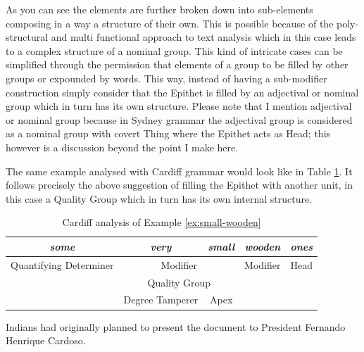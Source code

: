 As you can see the elements are further broken down into sub-elements composing in a way a structure of their own. This is possible because of the poly-structural and multi functional approach to text analysis which in this case leads to a complex structure of a nominal group. This kind of intricate cases can be simplified through the permission that elements of a group to be filled by other groups or expounded by words. This way, instead of having a sub-modifier construction simply consider that the Epithet is filled by an adjectival or nominal group which in turn has its own structure. Please note that I mention adjectival or nominal group because in Sydney grammar the adjectival group is considered as a nominal group with covert Thing where the Epithet acts as Head; this however is a discussion beyond the point I make here. 

The same example analysed with Cardiff grammar would look like in Table \ref{tab:example-substructure-analisys-cardiff}. It follows precisely the above suggestion of filling the Epithet with another unit, in this case a Quality Group which in turn has its own internal structure. 

\begin{table}[H]
    \centering
    \begin{tabular}{c|c|c|cc}
        \hline
        \multicolumn{1}{|c|}{\textit{some}}          & \textit{very}     & \textit{small} & \multicolumn{1}{c|}{\textit{wooden}} & \multicolumn{1}{c|}{\textit{ones}} \\ \hline
        \multicolumn{1}{|c|}{Quantifying Determiner} & \multicolumn{2}{c|}{Modifier}      & \multicolumn{1}{c|}{Modifier}        & \multicolumn{1}{c|}{Head}          \\ \hline
        & \multicolumn{2}{c|}{Quality Group} &                                      &                                    \\ \cline{2-3}
        & Degree Tamperer & Apex           &                                      &                                    \\ \cline{2-3}
    \end{tabular}
    \caption{Cardiff analysis of Example \ref{ex:small-wooden}}
    \label{tab:example-substructure-analisys-cardiff}
\end{table}


\begin{exe}
    \ex \label{ex:indians-planned} Indians had originally planned to present the document to President Fernando Henrique Cardoso.
\end{exe}


